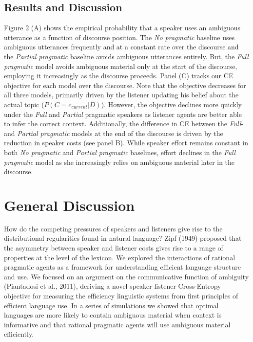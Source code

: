 \documentclass[10pt, letterpaper]{article}
\begin{document}
\subsection{Results and Discussion}\label{results-and-discussion-1}

Figure 2 (A) shows the empirical probability that a speaker uses an
ambiguous utterance as a function of discourse position. The
\textit{No pragmatic} baseline uses ambiguous utterances frequently and
at a constant rate over the discourse and the \textit{Partial pragmatic}
baseline avoids ambiguous utterances entirely. But, the
\textit{Full pragmatic} model avoids ambiguous material only at the
start of the discourse, employing it increasingly as the discourse
proceeds. Panel (C) tracks our CE objective for each model over the
discourse. Note that the objective decreases for all three models,
primarily driven by the listener updating his belief about the actual
topic (\(P(C=c_{current}|D)\)). However, the objective declines more
quickly under the \textit{Full} and \textit{Partial} pragmatic speakers
as listener agents are better able to infer the correct context.
Additionally, the difference in CE between the \textit{Full}- and
\textit{Partial pragmatic} models at the end of the discourse is driven
by the reduction in speaker costs (see panel B). While speaker effort
remains constant in both \textit{No pragmatic} and
\textit{Partial pragmatic} baselines, effort declines in the
\textit{Full pragmatic} model as she increasingly relies on ambiguous
material later in the discourse.\par

\section{General Discussion}\label{general-discussion}

How do the competing pressures of speakers and listeners give rise to
the distributional regularities found in natural language? Zipf (1949)
proposed that the asymmetry between speaker and listener costs gives
rise to a range of properties at the level of the lexicon. We explored
the interactions of rational pragmatic agents as a framework for
understanding efficient language structure and use. We focused on an
argument on the communicative function of ambiguity (Piantadosi et al.,
2011), deriving a novel speaker-listener Cross-Entropy objective for
measuring the efficiency linguistic systems from first principles of
efficient language use. In a series of simulations we showed that
optimal languages are more likely to contain ambiguous material when
context is informative and that rational pragmatic agents will use
ambiguous material efficiently.\par
\end{document}
